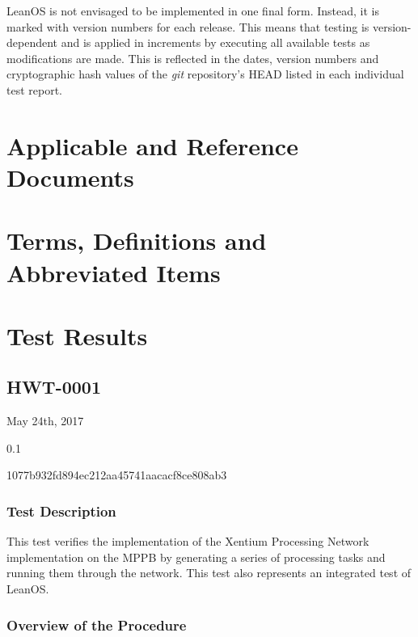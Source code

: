 LeanOS is not envisaged to be implemented in one final form. Instead, it is
marked with version numbers for each release. This means that testing is
version-dependent and is applied in increments by executing all available tests
as modifications are made. This is reflected in the dates, version
numbers and cryptographic hash values of the \emph{git} repository's {HEAD}
listed in each individual test report.

\chapter{Applicable and Reference Documents} %

\printbibliography[heading=none]


\chapter{Terms, Definitions and Abbreviated Items}
\printglossary[type=acronym]
\printglossary[type=main, style=altlist]


\chapter{Test Results}

\section{HWT-0001}

\begin{description}[labelwidth=4em,leftmargin=\parindent,labelindent=\parindent]
	\item[\textbf{Date}]	May 24th, 2017
	\item[\textbf{Version}]	0.1
	\item[\textbf{Hash}]	1077b932fd894ec212aa45741aacacf8ce808ab3
\end{description}

\subsection*{Test Description}

This test verifies the implementation of the \gls{Xentium} Processing Network
implementation on the \gls{MPPB} by generating a series of processing tasks and
running them through the network. This test also represents an integrated test
of LeanOS.

\subsection*{Overview of the Procedure}

